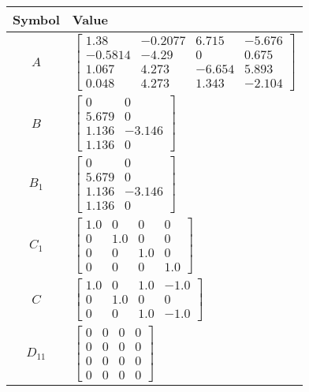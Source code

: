 \begin{tabular}{cl}
\hline
  Symbol  & Value                                                                                                                                                                 \\
\hline
   $A$    & $\left[\begin{matrix}1.38 & -0.2077 & 6.715 & -5.676\\-0.5814 & -4.29 & 0 & 0.675\\1.067 & 4.273 & -6.654 & 5.893\\0.048 & 4.273 & 1.343 & -2.104\end{matrix}\right]$ \\
   $B$    & $\left[\begin{matrix}0 & 0\\5.679 & 0\\1.136 & -3.146\\1.136 & 0\end{matrix}\right]$                                                                                  \\
 $B_{1}$  & $\left[\begin{matrix}0 & 0\\5.679 & 0\\1.136 & -3.146\\1.136 & 0\end{matrix}\right]$                                                                                  \\
 $C_{1}$  & $\left[\begin{matrix}1.0 & 0 & 0 & 0\\0 & 1.0 & 0 & 0\\0 & 0 & 1.0 & 0\\0 & 0 & 0 & 1.0\end{matrix}\right]$                                                           \\
   $C$    & $\left[\begin{matrix}1.0 & 0 & 1.0 & -1.0\\0 & 1.0 & 0 & 0\\0 & 0 & 1.0 & -1.0\end{matrix}\right]$                                                                    \\
 $D_{11}$ & $\left[\begin{matrix}0 & 0 & 0 & 0\\0 & 0 & 0 & 0\\0 & 0 & 0 & 0\\0 & 0 & 0 & 0\end{matrix}\right]$                                                                   \\

\end{tabular}
